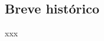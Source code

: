 \documentclass[pdftex, brazil, 12pt, twoside]{article}
\begin{document}
\subsection{Breve histórico}
\label{o-que-e-iot-historia}

xxx




\end{document}
